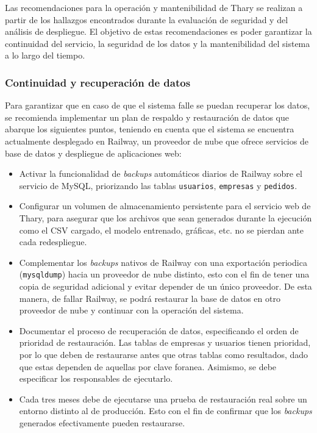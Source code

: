 
Las recomendaciones para la operación y mantenibilidad de Thary se realizan a partir de los hallazgos encontrados durante la evaluación de seguridad y del análisis de despliegue. El objetivo de estas recomendaciones es poder garantizar la continuidad del servicio, la seguridad de los datos y la mantenibilidad del sistema a lo largo del tiempo.

\subsubsection{Continuidad y recuperación de datos}

Para garantizar que en caso de que el sistema falle se puedan recuperar los datos, se recomienda implementar un plan de respaldo y restauración de datos que abarque los siguientes puntos, teniendo en cuenta que el sistema se encuentra actualmente desplegado en Railway, un proveedor de nube que ofrece servicios de base de datos y despliegue de aplicaciones web:

\begin{itemize}
    \item Activar la funcionalidad de \textit{backups} automáticos diarios de Railway sobre el servicio de MySQL, priorizando las tablas \texttt{usuarios}, \texttt{empresas} y \texttt{pedidos}.
    \item Configurar un volumen de almacenamiento persistente para el servicio web de Thary, para asegurar que los archivos que sean generados durante la ejecución como el CSV cargado, el modelo entrenado, gráficas, etc. no se pierdan ante cada redespliegue.
    \item Complementar los \textit{backups} nativos de Railway con una exportación periodica (\texttt{mysqldump}) hacia un proveedor de nube distinto, esto con el fin de tener una copia de seguridad adicional y evitar depender de un único proveedor. De esta manera, de fallar Railway, se podrá restaurar la base de datos en otro proveedor de nube y continuar con la operación del sistema.
    \item Documentar el proceso de recuperación de datos, especificando el orden de prioridad de restauración. Las tablas de empresas y usuarios tienen prioridad, por lo que deben de restaurarse antes que otras tablas como resultados, dado que estas dependen de aquellas por clave foranea. Asimismo, se debe especificar los responsables de ejecutarlo.
    \item Cada tres meses debe de ejecutarse una prueba de restauración real sobre un entorno distinto al de producción. Esto con el fin de confirmar que los \textit{backups} generados efectivamente pueden restaurarse.
\end{itemize}

